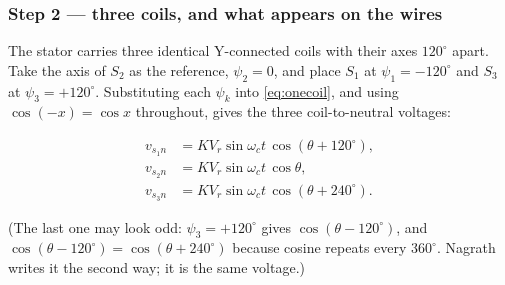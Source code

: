 \documentclass[11pt,a4paper]{article}
\begin{document}
\subsubsection{Step 2 --- three coils, and what appears on the wires}
\label{sss:three}

The stator carries three identical Y-connected coils with their axes
$120^\circ$ apart. Take the axis of $S_{2}$ as the reference, $\psi_{2}=0$,
and place $S_{1}$ at $\psi_{1}=-120^\circ$ and $S_{3}$ at
$\psi_{3}=+120^\circ$. Substituting each $\psi_{k}$ into \eqref{eq:onecoil},
and using $\cos(-x)=\cos x$ throughout, gives the three coil-to-neutral
voltages:

\begin{align}
  v_{s_{1}n}&=KV_{r}\sin\omega_{c}t\,\cos(\theta+120^\circ), \label{eq:v1}\\
  v_{s_{2}n}&=KV_{r}\sin\omega_{c}t\,\cos\theta,             \label{eq:v2}\\
  v_{s_{3}n}&=KV_{r}\sin\omega_{c}t\,\cos(\theta+240^\circ). \label{eq:v3}
\end{align}

(The last one may look odd: $\psi_{3}=+120^\circ$ gives
$\cos(\theta-120^\circ)$, and $\cos(\theta-120^\circ)=\cos(\theta+240^\circ)$
because cosine repeats every $360^\circ$. Nagrath writes it the second way; it
is the same voltage.)
\end{document}
